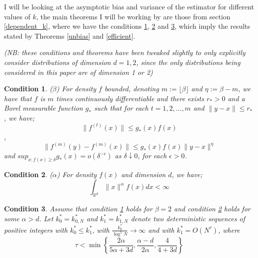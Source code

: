 \documentclass{report}
\newtheorem{remark}{Condition}
\begin{document}
I will be looking at the asymptotic bias and variance of the estimator for different values of $k$, the main theorems I will be working by are those from section \ref{dependent_k}, where we have the conditions \ref{A1}, \ref{A2} and \ref{A3}, which imply the results stated by Theorems \ref{unbias} and \ref{efficient}. 

\textit{(NB: these conditions and theorems have been tweaked slightly to only explicitly consider distributions of dimension $d=1, 2$, since the only distributions being considered in this paper are of dimension 1 or 2)}

\begin{remark} ($\beta$) \label{A1}
For density $f$ bounded, denoting $m := \lfloor \beta \rfloor$ and $\eta := \beta -m$, we have that $f$ is $m$ times continuously differentiable and there exists $r_{*} > 0$ and a Borel measurable function $g_{*}$ such that for each $t = 1, 2, ... , m$ and $\|y-x\| \leq r_{*}$, we have;
\begin{equation}
\| f^{(t)} (x) \| \leq g_{*}(x)f(x) \nonumber
\end{equation},
\begin{equation}
\| f^{(m)} (y) - f^{(m)} (x) \| \leq g_{*}(x)f(x) \|y-x\|^{\eta} \nonumber
\end{equation}
and $sup_{x:f(x)\geq \delta} g_{*}(x) = o(\delta^{-\epsilon})$ as $\delta \downarrow 0$, for each $\epsilon > 0$.
\end{remark}

\begin{remark} ($\alpha$) \label{A2}
For density $f(x)$ and dimension $d$, we have;
\begin{equation}
\int_{\mathbb{R}^{d}} \| x \|^{\alpha} f(x) dx < \infty \nonumber
\end{equation}
\end{remark}

\begin{remark} \label{A3}
Assume that condition \ref{A1} holds for $\beta = 2$ and condition \ref{A2} holds for some $\alpha > d$. Let $k_{0}^{*} = k_{0, N}^{*}$ and $k_{1}^{*} = k_{1, N}^{*}$ denote two deterministic sequences of positive integers with $k_{0}^{*} \leq k_{1}^{*}$, with $\frac{k_{0}^{*}}{\log^{5}{N}} \to \infty$ and with $k_{1}^{*} = O(N^{\tau})$, where
\begin{equation}
\tau < \min \left\{ \frac{2 \alpha}{5 \alpha + 3d} , \frac{\alpha - d}{2 \alpha} , \frac{4}{4 + 3d} \right\} \nonumber
\end{equation}
\end{remark}
\end{document}
